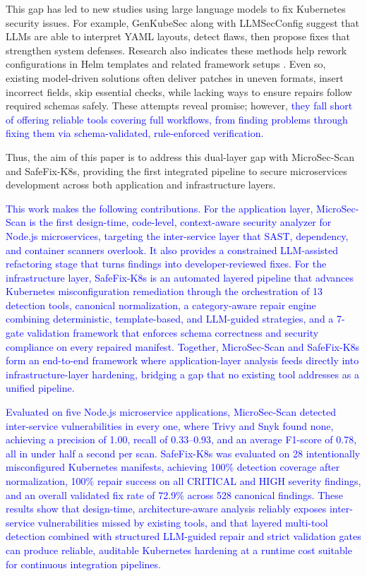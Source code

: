 \documentclass[preprint,12pt]{elsarticle}
\newcommand{\new}[1]{\textcolor{blue}{#1}}
\begin{document}
This gap has led to new studies using large language models to fix Kubernetes security issues. For example, GenKubeSec \cite{malul2024genkubesec} along with LLMSecConfig \cite{ye2025llmsecconfig} suggest that LLMs are able to interpret YAML layouts, detect flaws, then propose fixes that strengthen system defenses. Research also indicates these methods help rework configurations in Helm templates and related framework setups \cite{minna2025helmllm}. Even so, existing model-driven solutions often deliver patches in uneven formats, insert incorrect fields, skip essential checks, while lacking ways to ensure repairs follow required schemas safely. These attempts reveal promise; however, \new{they fall short of offering reliable tools covering full workflows, from finding problems through fixing them via schema-validated, rule-enforced verification.}


Thus, the aim of this paper is to address this dual-layer gap with MicroSec-Scan  and SafeFix-K8s, providing the first integrated pipeline to secure microservices development across both application and infrastructure layers.


\new{This work makes the following contributions. For the application layer, 
MicroSec-Scan is the first design-time, code-level, context-aware security 
analyzer for Node.js microservices, targeting the inter-service layer that 
SAST, dependency, and container scanners overlook. It also provides a 
constrained LLM-assisted refactoring stage that turns findings into 
developer-reviewed fixes. For the infrastructure layer, SafeFix-K8s is an 
automated layered pipeline that advances Kubernetes misconfiguration 
remediation through the orchestration of 13 detection tools, canonical 
normalization, a category-aware repair engine combining deterministic, 
template-based, and LLM-guided strategies, and a 7-gate validation framework 
that enforces schema correctness and security compliance on every repaired 
manifest. Together, MicroSec-Scan and SafeFix-K8s form an end-to-end 
framework where application-layer analysis feeds directly into 
infrastructure-layer hardening, bridging a gap that no existing tool 
addresses as a unified pipeline.}

\new{Evaluated on five Node.js microservice applications, MicroSec-Scan 
detected inter-service vulnerabilities in every one, where Trivy and Snyk 
found none, achieving a precision of 1.00, recall of 0.33--0.93, and an 
average F1-score of 0.78, all in under half a second per scan. SafeFix-K8s 
was evaluated on 28 intentionally misconfigured Kubernetes manifests, 
achieving 100\% detection coverage after normalization, 100\% repair success 
on all CRITICAL and HIGH severity findings, and an overall validated fix rate 
of 72.9\% across 528 canonical findings. These results show that design-time, 
architecture-aware analysis reliably exposes inter-service vulnerabilities 
missed by existing tools, and that layered multi-tool detection combined with 
structured LLM-guided repair and strict validation gates can produce 
reliable, auditable Kubernetes hardening at a runtime cost suitable for 
continuous integration pipelines.}
\end{document}
